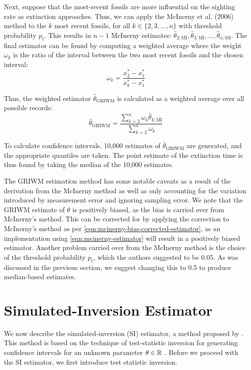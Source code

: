 Next, suppose that the most-recent fossils are more influential on the sighting rate as extinction approaches. Thus, we can apply the McInerny et al. (2006) method to the $k$ most recent fossils, for all $k \in \{2, 3, \dots, n\}$ with threshold probability $p_t$. This results in $n-1$ McInerny estimates: $\hat\theta_{2; \text{MI}}, \hat\theta_{3; \text{MI}}, \dots, \hat\theta_{n; \text{MI}}$. The final estimator can be found by computing a weighted average where the weight $\omega_k$ is the ratio of the interval between the two most recent fossils and the chosen interval:\[
\omega_k = \frac{x^*_{2} - x^*_{1}}{x^*_{k} - x^*_{1}}
\]

Thus, the weighted estimator $\hat\theta_{\text{GRIWM}}$ is calculated as a weighted average over all possible records:\begin{equation}\label{eq:griwm1}
    \hat\theta_{\text{GRIWM}} = \frac{\sum_{k=2}^{n} \omega_k \hat\theta_{k; \text{MI}}}{\sum_{k=2}^{n} \omega_k}
\end{equation}

To calculate confidence intervals, 10,000 estimates of $\hat\theta_{\text{GRIWM}}$ are generated, and the appropriate quantiles are taken. The point estimate of the extinction time is thus found by taking the median of the 10,000 estimates.

The GRIWM estimation method has some notable caveats as a result of the derivation from the McInerny method as well as only accounting for the variation introduced by measurement error and ignoring sampling error. We note that the GRIWM estimate of $\theta$ is positively biased, as the bias is carried over from McInerny's method. This can be corrected for by applying the correction to McInerny's method as per \autoref{eqn:mcinerny-bias-corrected-estimator}, as an implementation using \autoref{eqn:mcinerny-estimator} will result in a positively biased estimator. Another problem carried over from the McInerny method is the choice of the threshold probability $p_t$, which the authors suggested to be 0.05. As was discussed in the previous section, we suggest changing this to 0.5 to produce median-based estimates.

\section{Simulated-Inversion Estimator}

We now describe the simulated-inversion (SI) estimator, a method proposed by \citet{Huang2019}. This method is based on the technique of test-statistic inversion for generating confidence intervals for an unknown parameter $\theta \in \mathbb{R}$ \cite{Carpenter1999}. Before we proceed with the SI estimator, we first introduce test statistic inversion.

